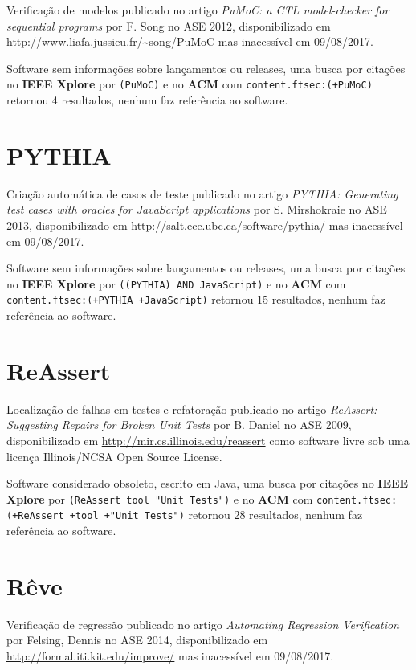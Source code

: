 Verificação de modelos
publicado no artigo {\it PuMoC: a CTL model-checker for sequential programs}
por F. Song
no ASE 2012,
disponibilizado em \url{http://www.liafa.jussieu.fr/~song/PuMoC}
mas inacessível em 09/08/2017.

Software sem informações sobre lançamentos ou releases,
uma busca por citações no {\bf IEEE Xplore} por
\texttt{(PuMoC)}
e no {\bf ACM} com
\texttt{content.ftsec:(+PuMoC)}
retornou
4 resultados,
nenhum faz referência ao software.



\section{PYTHIA}

Criação automática de casos de teste
publicado no artigo {\it PYTHIA: Generating test cases with oracles for JavaScript applications}
por S. Mirshokraie
no ASE 2013,
disponibilizado em \url{http://salt.ece.ubc.ca/software/pythia/}
mas inacessível em 09/08/2017.

Software sem informações sobre lançamentos ou releases,
uma busca por citações no {\bf IEEE Xplore} por
\texttt{((PYTHIA) AND JavaScript)}
e no {\bf ACM} com
\texttt{content.ftsec:(+PYTHIA +JavaScript)}
retornou
15 resultados,
nenhum faz referência ao software.



\section{ReAssert}

Localização de falhas em testes e refatoração
publicado no artigo {\it ReAssert: Suggesting Repairs for Broken Unit Tests}
por B. Daniel
no ASE 2009,
disponibilizado em \url{http://mir.cs.illinois.edu/reassert}
como software livre
sob uma licença Illinois/NCSA Open Source License.

Software considerado obsoleto,
escrito em Java,
uma busca por citações no {\bf IEEE Xplore} por
\texttt{(ReAssert tool "Unit Tests")}
e no {\bf ACM} com
\texttt{content.ftsec:(+ReAssert +tool +"Unit Tests")}
retornou
28 resultados,
nenhum faz referência ao software.



\section{Rêve}

Verificação de regressão
publicado no artigo {\it Automating Regression Verification}
por Felsing, Dennis
no ASE 2014,
disponibilizado em \url{http://formal.iti.kit.edu/improve/}
mas inacessível em 09/08/2017.


